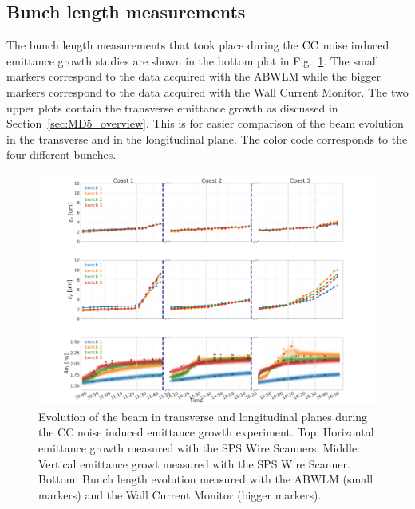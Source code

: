 \subsection{Bunch length measurements}\label{subsec:bunch_length_meas_2018}
The bunch length measurements that took place during the ${\mathrm{CC}}$ noise induced emittance growth studies are shown in the bottom plot in Fig.~\ref{fig:MD5_overview_x_y_sigma_t}. The small markers correspond to the data acquired with the ABWLM while the bigger markers correspond to the data acquired with the Wall Current Monitor. The two upper plots contain the transverse emittance growth as discussed in Section~\ref{sec:MD5_overview}. This is for easier comparison of the beam evolution in the transverse and in the longitudinal plane. The color code corresponds to the four different bunches.

\begin{figure}
   \centering
   \includegraphics[width=1.0\textwidth]{images/Ch5/MD5_overview_x_no_legendMD5_overview_y_no_legendMD5_overview_4sigma_t_no_title_with_wall_current_monitor.png}
   \caption{Evolution of the beam in transverse and longitudinal planes during the CC noise induced emittance growth experiment. Top: Horizontal emittance growth measured with the SPS Wire Scanners. Middle: Vertical emittance growt measured with the SPS Wire Scanner. Bottom: Bunch length evolution measured with the ABWLM (small markers) and the Wall Current Monitor (bigger markers).}
   \label{fig:MD5_overview_x_y_sigma_t}
\end{figure}

